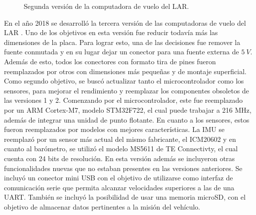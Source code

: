 %     

\begin{figure}[htb]
    \centering
    
    \caption{Segunda versión de la computadora de vuelo del LAR.}
    \label{fig:Choriboard_2}
\end{figure}



En el año 2018 se desarrolló la tercera versión de las computadoras de vuelo del LAR \cite{garberoglio2019diseno}. Uno de los objetivos en esta versión fue reducir todavía más las dimensiones de la placa. Para lograr esto, una de las decisiones fue remover la fuente conmutada y en su lugar dejar un conector para una fuente externa de $5 \ V$. Además de esto, todos los conectores con formato tira de pines fueron reemplazados por otros con dimensiones más pequeñas y de montaje superficial. Como segundo objetivo, se buscó actualizar tanto el microcontrolador como los sensores, para mejorar el rendimiento y reemplazar los componentes obsoletos de las versiones 1 y 2. Comenzando por el microcontrolador, este fue reemplazado por un ARM Cortex-M7, modelo STM32F722, el cual puede trabajar a 216 MHz, además de integrar una unidad de punto flotante. En cuanto a los sensores, estos fueron reemplazados por modelos con mejores características. La IMU se reemplazó por un sensor más actual del mismo fabricante, el ICM20602 y en cuanto al barómetro, se utilizó el modelo MS5611 de TE Connectivty, el cual cuenta con 24 bits de resolución. En esta versión además se incluyeron otras funcionalidades nuevas que no estaban presentes en las versiones anteriores. Se incluyó un conector mini USB con el objetivo de utilizarse como interfaz de comunicación serie que permita alcanzar velocidades superiores a las de una UART. También se incluyó la posibilidad de usar una memoria microSD, con el objetivo de almacenar datos pertinentes a la misión del vehículo.


